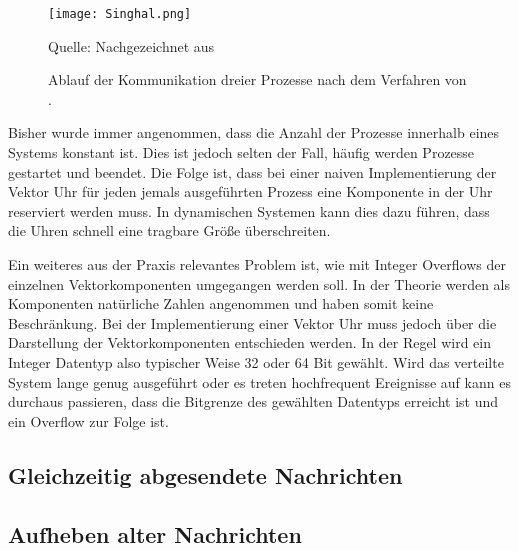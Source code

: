 \begin{figure}[ht]
    \centering
    \texttt{[image: Singhal.png]}
    \caption[Kommunikaiton nach Singhal]{Ablauf der Kommunikation dreier Prozesse nach dem Verfahren von .}
    Quelle: Nachgezeichnet aus \cite{Baldoni:2002:FDC:1435723.1437765}
    \label{fig:singhal}
\end{figure}

Bisher wurde immer angenommen, dass die Anzahl der Prozesse innerhalb eines Systems konstant ist.
Dies ist jedoch selten der Fall, häufig werden Prozesse gestartet und beendet.
Die Folge ist, dass bei einer naiven Implementierung der Vektor Uhr für jeden jemals ausgeführten Prozess eine Komponente in der Uhr reserviert werden muss.
In dynamischen Systemen kann dies dazu führen, dass die Uhren schnell eine tragbare Größe überschreiten.



Ein weiteres aus der Praxis relevantes Problem ist, wie mit Integer Overflows der einzelnen Vektorkomponenten umgegangen werden soll.
In der Theorie werden als Komponenten natürliche Zahlen angenommen und haben somit keine Beschränkung.
Bei der Implementierung einer Vektor Uhr muss jedoch über die Darstellung der Vektorkomponenten entschieden werden.
In der Regel wird ein Integer Datentyp also typischer Weise 32 oder 64 Bit gewählt.
Wird das verteilte System lange genug ausgeführt oder es treten hochfrequent Ereignisse auf kann es durchaus passieren, dass die Bitgrenze des gewählten Datentyps erreicht ist und ein Overflow zur Folge ist.

\subsection{Gleichzeitig abgesendete Nachrichten}

\subsection{Aufheben alter Nachrichten}




